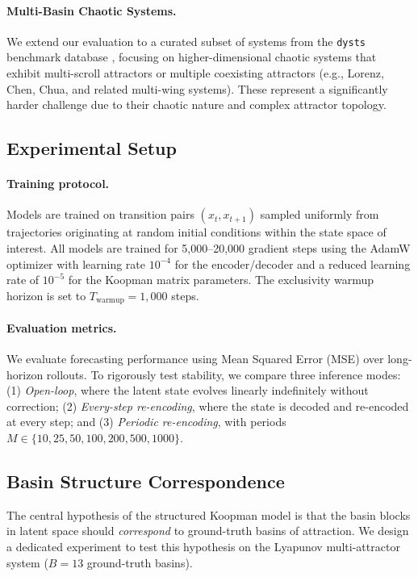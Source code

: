 \paragraph{Multi-Basin Chaotic Systems.}
We extend our evaluation to a curated subset of systems from the \texttt{dysts} benchmark database \citep{gilpin_chaos_2021, gilpin_model_2023}, focusing on higher-dimensional chaotic systems that exhibit multi-scroll attractors or multiple coexisting attractors (e.g., Lorenz, Chen, Chua, and related multi-wing systems). These represent a significantly harder challenge due to their chaotic nature and complex attractor topology.

\subsection{Experimental Setup}

\paragraph{Training protocol.}
Models are trained on transition pairs $(x_t, x_{t+1})$ sampled uniformly from trajectories originating at random initial conditions within the state space of interest. All models are trained for 5,000--20,000 gradient steps using the AdamW optimizer with learning rate $10^{-4}$ for the encoder/decoder and a reduced learning rate of $10^{-5}$ for the Koopman matrix parameters. The exclusivity warmup horizon is set to $T_{\text{warmup}} = 1,000$ steps.

\paragraph{Evaluation metrics.}
We evaluate forecasting performance using Mean Squared Error (MSE) over long-horizon rollouts. To rigorously test stability, we compare three inference modes: (1) \textit{Open-loop}, where the latent state evolves linearly indefinitely without correction; (2) \textit{Every-step re-encoding}, where the state is decoded and re-encoded at every step; and (3) \textit{Periodic re-encoding}, with periods $M \in \{10, 25, 50, 100, 200, 500, 1000\}$.

\subsection{Basin Structure Correspondence}
\label{sec:basin-experiment}

The central hypothesis of the structured Koopman model is that the basin blocks in latent space should \emph{correspond} to ground-truth basins of attraction. We design a dedicated experiment to test this hypothesis on the Lyapunov multi-attractor system ($B = 13$ ground-truth basins).

